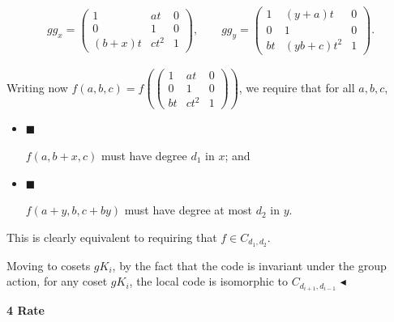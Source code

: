 \[\begin{gathered}
gg_{x}=\begin{pmatrix}1&at&0\\
0&1&0\\
(b+x)t&ct^{2}&1\end{pmatrix},\qquad gg_{y}=\begin{pmatrix}1&(y+a)t&0\\
0&1&0\\
bt&(yb+c)t^{2}&1\end{pmatrix}.
\end{gathered}\]


Writing now $f(a,b,c)=f\left(\begin{pmatrix}1&at&0\\
0&1&0\\
bt&ct^{2}&1\end{pmatrix}\right)$, we require that for all $a,b,c$,\par


\begin{itemize}


\item[] 
$\blacksquare$ 


$f(a,b+x,c)$ must have degree $d_{1}$ in $x$; and\par





\item[] 
$\blacksquare$ 


$f(a+y,b,c+by)$ must have degree at most $d_{2}$ in $y$.\par





\end{itemize}


This is clearly equivalent to requiring that $f\in C_{d_{1},d_{2}}$.\par




Moving to cosets $gK_{i}$, by the fact that the code is invariant under the group action, for any coset $gK_{i}$, the local code is isomorphic to $C_{d_{i+1},d_{i-1}}$
$\blacktriangleleft$\par







\par\medskip\noindent\textbf{
4 Rate}\par





